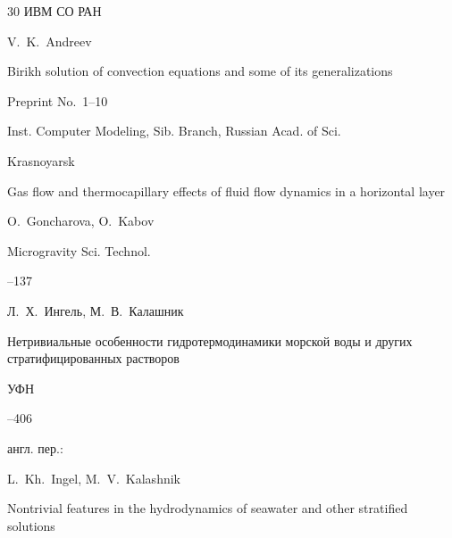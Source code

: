 {\begin{thebibliography}{30}
\publ ИВМ СО РАН



\misctransl

\by V.~K.~Andreev

\preprint Birikh solution of convection equations and some of its generalizations

\preprintinfo  Preprint No.~1–10

\publ Inst. Computer Modeling, Sib. Branch, Russian Acad. of Sci.

\publaddr Krasnoyarsk 






\paper Gas flow and thermocapillary effects of fluid flow dynamics in a horizontal layer

\by O.~Goncharova, O.~Kabov

\jour Microgravity Sci. Technol.




--137













\by Л.~Х.~Ингель, М.~В.~Калашник

\paper Нетривиальные особенности гидротермодинамики морской воды и других стратифицированных растворов

\jour УФН




--406



\transl англ. пер.:~

\by  L.~Kh.~Ingel, M.~V.~Kalashnik  

\paper Nontrivial features in the hydrodynamics of seawater and other stratified solutions


\end{thebibliography}}
